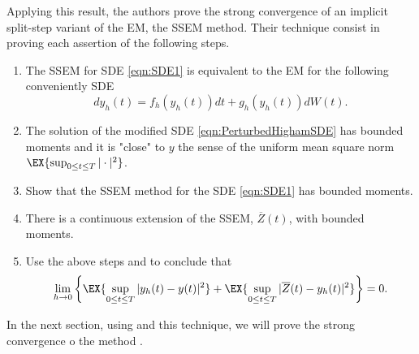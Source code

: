 	Applying this result, the authors prove the strong convergence of an implicit split-step variant of the EM, the
SSEM method. 
Their technique consist in proving each assertion of the following steps.
\begin{enumerate}[\bf{Step} 1:]
	\item
		\label{stp:EMCorrespondence}
		The SSEM for SDE \eqref{eqn:SDE1} is equivalent to the EM for the following conveniently SDE
		\begin{equation}\label{eqn:PerturbedHighamSDE}
			dy_h(t)= f_h(y_h(t))dt +g_h(y_h(t))dW(t).
		\end{equation}
	\item\label{stp:PerturbedSolution}
			The solution of the modified SDE \eqref{eqn:PerturbedHighamSDE} has bounded moments and it is 
			"close" to  $y$ the sense of the uniform mean square norm 
			$
				\EX{\sup_{0\leq t\leq T}|\cdot|^2}
			$.
	\item
	\label{stp:MethodBoundedMoments}
		Show that the SSEM method for the SDE \eqref{eqn:SDE1} has bounded moments.
	\item
		There is a continuous extension of the SSEM, $\overline{Z}(t)$, with bounded moments.
	\item
		Use the above steps and  to conclude that
		\begin{equation}
			\lim_{h\to 0}
			\left\{
				\EX{\sup_{0\leq t\leq T}|y_h(t)-y(t)|^2}
			+
			\EX{\sup_{0\leq t\leq T}|\overline{Z}(t) -y_h(t)|^2}
			\right\}=0.
		\end{equation}
\end{enumerate}
In the next section, using  and this technique, we will prove the strong convergence o 
the \SM method .
%